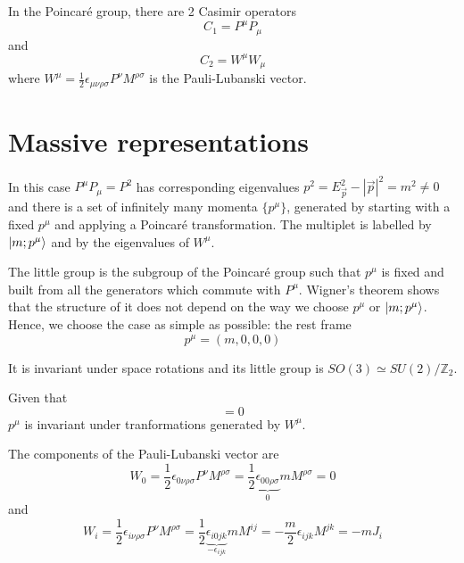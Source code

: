     In the Poincaré group, there are 2 Casimir operators 
    \begin{equation*}
        C_1 = P^\mu P_\mu 
    \end{equation*}
    and 
    \begin{equation*}
        C_2 = W^\mu W_\mu 
    \end{equation*}
    where $W^\mu = \frac{1}{2} \epsilon_{\mu\nu\rho\sigma} P^\nu M^{\rho\sigma}$ is the Pauli-Lubanski vector.

\section{Massive representations}

    In this case $P^\mu P_\mu = P^2$ has corresponding eigenvalues $p^2 = E_{\vec p}^2 - |\vec p|^2 = m^2 \neq 0$ and there is a set of infinitely many momenta $\{p^\mu\}$, generated by starting with a fixed $p^\mu$ and applying a Poincaré transformation. The multiplet is labelled by $\vert m ; p^\mu\rangle$ and by the eigenvalues of $W^\mu$. 

    The little group is the subgroup of the Poincaré group such that $p^\mu$ is fixed and built from all the generators which commute with $P^\mu$. Wigner's theorem shows that the structure of it does not depend on the way we choose $p^\mu$ or $\vert m ; p^\mu\rangle$. Hence, we choose the case as simple as possible: the rest frame 
    \begin{equation*}
        p^\mu = (m, 0, 0, 0)
    \end{equation*}

    It is invariant under space rotations and its little group is $SO(3) \simeq SU(2) / \mathbb Z_2$. 

    Given that 
    \begin{equation*}
        [P^\mu, W_\mu] = 0
    \end{equation*}
    $p^\mu$ is invariant under tranformations generated by $W^\mu$.

    The components of the Pauli-Lubanski vector are 
    \begin{equation*}
        W_0 = \frac{1}{2} \epsilon_{0 \nu \rho \sigma} P^\nu M^{\rho \sigma}= \frac{1}{2} \underbrace{\epsilon_{0 0 \rho \sigma}}_{0} m M^{\rho \sigma} = 0
    \end{equation*}
    and 
    \begin{equation*}
        W_i = \frac{1}{2} \epsilon_{i \nu \rho \sigma} P^\nu M^{\rho \sigma} = \frac{1}{2} \underbrace{\epsilon_{i 0 jk}}_{- \epsilon_{ijk}} m M^{ij} = - \frac{m}{2} \epsilon_{ijk} M^{jk} = - m J_i
    \end{equation*}

